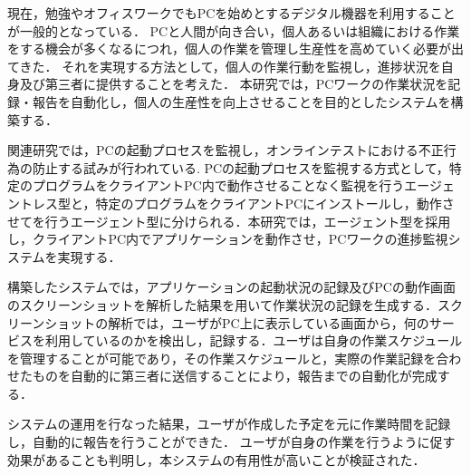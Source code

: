 現在，勉強やオフィスワークでもPCを始めとするデジタル機器を利用することが一般的となっている．
PCと人間が向き合い，個人あるいは組織における作業をする機会が多くなるにつれ，個人の作業を管理し生産性を高めていく必要が出てきた．
それを実現する方法として，個人の作業行動を監視し，進捗状況を自身及び第三者に提供することを考えた．
本研究では，PCワークの作業状況を記録・報告を自動化し，個人の生産性を向上させることを目的としたシステムを構築する．

関連研究では，PCの起動プロセスを監視し，オンラインテストにおける不正行為の防止する試みが行われている.
PCの起動プロセスを監視する方式として，特定のプログラムをクライアントPC内で動作させることなく監視を行うエージェントレス型と，特定のプログラムをクライアントPCにインストールし，動作させてを行うエージェント型に分けられる．本研究では，エージェント型を採用し，クライアントPC内でアプリケーションを動作させ，PCワークの進捗監視システムを実現する．

構築したシステムでは，アプリケーションの起動状況の記録及びPCの動作画面のスクリーンショットを解析した結果を用いて作業状況の記録を生成する．スクリーンショットの解析では，ユーザがPC上に表示している画面から，何のサービスを利用しているのかを検出し，記録する．ユーザは自身の作業スケジュールを管理することが可能であり，その作業スケジュールと，実際の作業記録を合わせたものを自動的に第三者に送信することにより，報告までの自動化が完成する．

システムの運用を行なった結果，ユーザが作成した予定を元に作業時間を記録し，自動的に報告を行うことができた．
ユーザが自身の作業を行うように促す効果があることも判明し，本システムの有用性が高いことが検証された．
